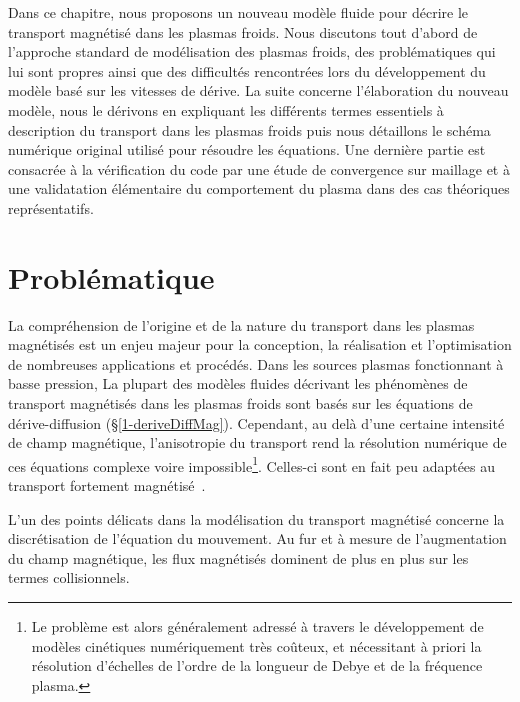 \begin{refsection}


Dans ce chapitre, nous proposons un nouveau modèle fluide pour décrire le
transport magnétisé dans les plasmas froids. Nous discutons tout d'abord de
l'approche standard de modélisation des plasmas froids, des problématiques qui
lui sont propres ainsi que des difficultés rencontrées lors du développement du
modèle basé sur les vitesses de dérive. La suite concerne l'élaboration du
nouveau modèle, nous le dérivons en expliquant les différents termes essentiels
à description du transport dans les plasmas froids puis nous détaillons le
schéma numérique original utilisé pour résoudre les équations.
Une dernière partie est consacrée à la vérification du code par une étude de
convergence sur maillage et à une validatation élémentaire du comportement du
plasma dans des cas théoriques représentatifs.



\section{Problématique}

La compréhension de l'origine et de la nature du transport dans les plasmas
magnétisés est un enjeu majeur pour la conception, la réalisation et
l'optimisation de nombreuses applications et procédés. Dans les sources plasmas
fonctionnant à basse pression,  La plupart des modèles fluides décrivant les
phénomènes de transport magnétisés dans les plasmas froids sont basés sur les
équations de dérive-diffusion (\S \ref{1-deriveDiffMag}). Cependant, au delà
d'une certaine intensité de champ magnétique, l'anisotropie du transport rend
la résolution numérique de ces équations complexe voire impossible\footnote{Le
problème est alors généralement adressé à travers le développement de modèles cinétiques numériquement très coûteux, et nécessitant à priori la résolution d'échelles de l'ordre de la longueur de Debye et de la fréquence plasma.}.
Celles-ci sont en fait peu adaptées au transport fortement
magnétisé~\parencite{Golant}.

L'un des points délicats dans la modélisation du transport magnétisé concerne la
discrétisation de l'équation du mouvement. Au fur et à mesure de l'augmentation
du champ magnétique, les flux magnétisés dominent de plus en plus sur les termes
collisionnels.


\end{refsection}
